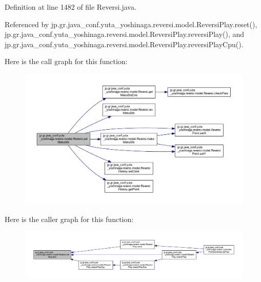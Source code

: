 Definition at line 1482 of file Reversi.\+java.



Referenced by jp.\+gr.\+java\+\_\+conf.\+yuta\+\_\+yoshinaga.\+reversi.\+model.\+Reversi\+Play.\+reset(), jp.\+gr.\+java\+\_\+conf.\+yuta\+\_\+yoshinaga.\+reversi.\+model.\+Reversi\+Play.\+reversi\+Play(), and jp.\+gr.\+java\+\_\+conf.\+yuta\+\_\+yoshinaga.\+reversi.\+model.\+Reversi\+Play.\+reversi\+Play\+Cpu().

Here is the call graph for this function\+:
\nopagebreak
\begin{figure}[H]
\begin{center}
\leavevmode
\includegraphics[width=350pt]{classjp_1_1gr_1_1java__conf_1_1yuta__yoshinaga_1_1reversi_1_1model_1_1_reversi_a7abf9238b933653eec2908f6e1a863db_cgraph}
\end{center}
\end{figure}
Here is the caller graph for this function\+:
\nopagebreak
\begin{figure}[H]
\begin{center}
\leavevmode
\includegraphics[width=350pt]{classjp_1_1gr_1_1java__conf_1_1yuta__yoshinaga_1_1reversi_1_1model_1_1_reversi_a7abf9238b933653eec2908f6e1a863db_icgraph}
\end{center}
\end{figure}
\mbox{\label{classjp_1_1gr_1_1java__conf_1_1yuta__yoshinaga_1_1reversi_1_1model_1_1_reversi_af2ba1c808c067c94106d04ccd5e25e3b}} 
